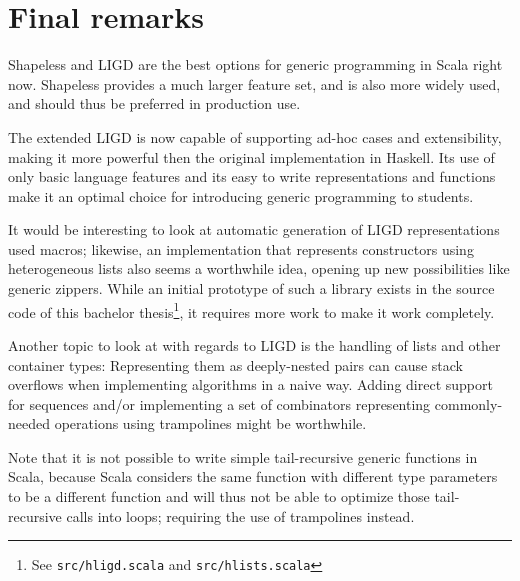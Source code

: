 \section{Final remarks}
Shapeless and LIGD are the best options for generic programming in Scala
right now. Shapeless provides a much larger feature set, and is also more
widely used, and should thus be preferred in production use.

The extended LIGD is now capable of supporting ad-hoc cases and extensibility,
making it more powerful then the original implementation in Haskell. Its use
of only basic language features and its easy to write representations and
functions make it an optimal choice for introducing generic programming to
students.

It would be interesting to look at automatic generation of LIGD representations
used macros; likewise, an implementation that represents constructors using
heterogeneous lists also seems a worthwhile idea, opening up new possibilities
like generic zippers. While an initial prototype of such a library exists in
the source code of this bachelor thesis\footnote{See \texttt{src/hligd.scala} and
\texttt{src/hlists.scala}}, it requires more work to make it work completely.

Another topic to look at with regards to LIGD is the handling of lists and
other container types: Representing them as deeply-nested pairs can cause
stack overflows when implementing algorithms in a naive way. Adding direct
support for sequences and/or implementing a set of combinators representing
commonly-needed operations using trampolines might be worthwhile.

Note that it is not possible to write simple tail-recursive generic functions in Scala,
because Scala considers the same function with different type parameters
to be a different function and will thus not be able to optimize those
tail-recursive calls into loops; requiring the use of trampolines instead.

